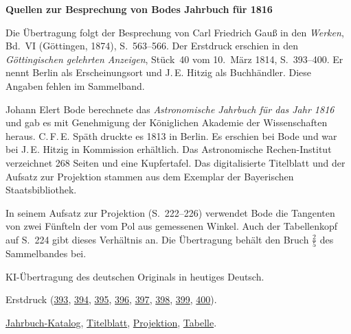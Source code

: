 \clearpage\thispagestyle{empty}
\begin{center}\Large\bfseries Quellen zur Besprechung von Bodes Jahrbuch für 1816\end{center}

Die Übertragung folgt der Besprechung von Carl Friedrich Gauß in den \emph{Werken}, Bd.~VI (Göttingen, 1874), S.~563--566. Der Erstdruck erschien in den \emph{Göttingischen gelehrten Anzeigen}, Stück~40 vom 10.~März 1814, S.~393--400. Er nennt Berlin als Erscheinungsort und J.\,E. Hitzig als Buchhändler. Diese Angaben fehlen im Sammelband.

Johann Elert Bode berechnete das \emph{Astronomische Jahrbuch für das Jahr 1816} und gab es mit Genehmigung der Königlichen Akademie der Wissenschaften heraus. C.\,F.\,E. Späth druckte es 1813 in Berlin. Es erschien bei Bode und war bei J.\,E. Hitzig in Kommission erhältlich. Das Astronomische Rechen-Institut verzeichnet 268 Seiten und eine Kupfertafel. Das digitalisierte Titelblatt und der Aufsatz zur Projektion stammen aus dem Exemplar der Bayerischen Staatsbibliothek.

In seinem Aufsatz zur Projektion (S.~222--226) verwendet Bode die Tangenten von zwei Fünfteln der vom Pol aus gemessenen Winkel. Auch der Tabellenkopf auf S.~224 gibt dieses Verhältnis an. Die Übertragung behält den Bruch $\frac{2}{5}$ des Sammelbandes bei.

KI-Übertragung des deutschen Originals in heutiges Deutsch.

Erstdruck (\href{https://images.p.sub.uni-goettingen.de/iiif/image/gdz:PPN319721507_1814:00000395/full/1650,/0/default.jpg}{393}, \href{https://images.p.sub.uni-goettingen.de/iiif/image/gdz:PPN319721507_1814:00000396/full/1650,/0/default.jpg}{394}, \href{https://images.p.sub.uni-goettingen.de/iiif/image/gdz:PPN319721507_1814:00000397/full/1650,/0/default.jpg}{395}, \href{https://images.p.sub.uni-goettingen.de/iiif/image/gdz:PPN319721507_1814:00000398/full/1650,/0/default.jpg}{396}, \href{https://images.p.sub.uni-goettingen.de/iiif/image/gdz:PPN319721507_1814:00000399/full/1650,/0/default.jpg}{397}, \href{https://images.p.sub.uni-goettingen.de/iiif/image/gdz:PPN319721507_1814:00000400/full/1650,/0/default.jpg}{398}, \href{https://images.p.sub.uni-goettingen.de/iiif/image/gdz:PPN319721507_1814:00000401/full/1650,/0/default.jpg}{399}, \href{https://images.p.sub.uni-goettingen.de/iiif/image/gdz:PPN319721507_1814:00000402/full/1650,/0/default.jpg}{400}).

\href{https://wwwadd.zah.uni-heidelberg.de/publikationen/baj/baj1816/baj1816.htm}{Jahrbuch-Katalog}, \href{https://www.digitale-sammlungen.de/view/bsb10538345?page=5}{Titelblatt}, \href{https://www.digitale-sammlungen.de/view/bsb10538345?page=231}{Projektion}, \href{https://www.digitale-sammlungen.de/view/bsb10538345?page=232}{Tabelle}.

\clearpage
